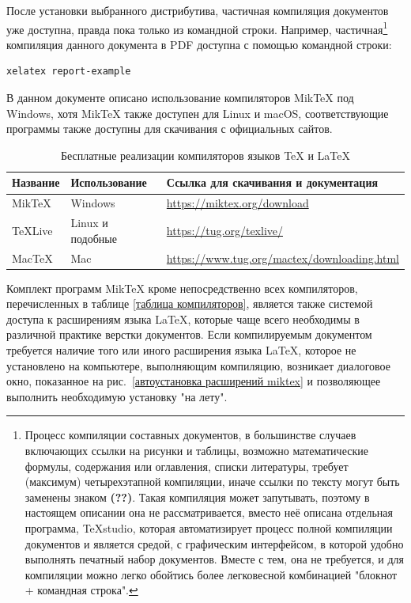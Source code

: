 \documentclass[report, draught]{fefudoc}
\begin{document}
После установки выбранного дистрибутива, частичная компиляция документов уже доступна, правда пока только из командной строки.
Например,
частичная\footnote{Процесс компиляции составных документов, в большинстве случаев включающих ссылки на рисунки и таблицы, возможно математические формулы, содержания или оглавления, списки литературы, требует (максимум) четырехэтапной компиляции, иначе ссылки по тексту могут быть заменены знаком \textbf{(??)}. Такая компиляция может запутывать, поэтому в настоящем описании она не рассматривается, вместо неё описана отдельная программа, TeXstudio, которая автоматизирует процесс полной компиляции документов и является средой, с графическим интерфейсом, в которой удобно выполнять печатный набор документов. Вместе с тем, она не требуется, и для компиляции можно легко обойтись более легковесной комбинацией "блокнот + командная строка".}
компиляция данного документа в PDF доступна с помощью командной строки:
\begin{lstlisting}
xelatex report-example
\end{lstlisting}

В данном документе описано использование компиляторов MikTeX под Windows, хотя MikTeX также доступен для Linux и macOS, соответствующие программы также доступны для скачивания с официальных сайтов.

\begin{table}
\centering
\caption{Бесплатные реализации компиляторов языков \TeX{} и \LaTeX{}}
\label{таблица дистрибутивов}
\begin{tabularx}{\textwidth}{|l|l|X|}
\hline
\textbf{Название} & \textbf{Использование} & \textbf{Ссылка для скачивания и документация}     \\ \hline
MikTeX            & Windows                & \url{https://miktex.org/download}                 \\ \hline
TeXLive           & Linux и подобные       & \url{https://tug.org/texlive/}                    \\ \hline
MacTeX            & Mac                    & \url{https://www.tug.org/mactex/downloading.html} \\ \hline
\end{tabularx}
\end{table}

Комплект программ MikTeX кроме непосредственно всех компиляторов, перечисленных в таблице \ref{таблица компиляторов}, является также системой доступа к расширениям языка \LaTeX{}, которые чаще всего необходимы в различной практике верстки документов.
Если компилируемым документом требуется наличие того или иного расширения языка \LaTeX, которое не установлено на компьютере, выполняющим компиляцию, возникает диалоговое окно, показанное на рис.~\ref{автоустановка расширений miktex} и позволяющее выполнить необходимую установку "на лету".
\end{document}
